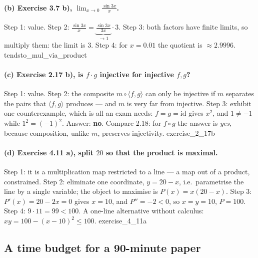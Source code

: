 \documentclass[11pt,a4paper]{article}
\theoremstyle{definition}
\newcommand{\lean}[1]{\textsf{\small #1}}
\begin{document}
\paragraph{(b) Exercise 3.7 b), $\lim_{x\to0}\frac{\sin 3x}{x}$.}
Step 1: value.  Step 2: $\frac{\sin 3x}{x}=\underbrace{\frac{\sin 3x}{3x}}_{\to 1}\cdot 3$.
Step 3: both factors have finite limits, so multiply them: the limit is $3$.
Step 4: for $x=0.01$ the quotient is $\approx 2.9996$. \hfill\lean{tendsto\_mul\_via\_product}

\paragraph{(c) Exercise 2.17 b), is $f\cdot g$ injective for injective $f,g$?}
Step 1: value.  Step 2: the composite $m\circ\langle f,g\rangle$ can only be injective if
$m$ separates the pairs that $\langle f,g\rangle$ produces --- and $m$ is very far from
injective.  Step 3: exhibit one counterexample, which is all an exam needs:
$f=g=\mathrm{id}$ gives $x^2$, and $1\neq-1$ while $1^2=(-1)^2$.  Answer: \textbf{no}.
Compare 2.18: for $f\circ g$ the answer is \emph{yes}, because composition, unlike $m$,
preserves injectivity. \hfill\lean{exercise\_2\_17b}

\paragraph{(d) Exercise 4.11 a), split $20$ so that the product is maximal.}
Step 1: it is a multiplication map restricted to a line --- a map out of a product,
constrained.  Step 2: eliminate one coordinate, $y=20-x$, i.e.\ parametrise the line by a
single variable; the object to maximise is $P(x)=x(20-x)$.  Step 3: $P'(x)=20-2x=0$ gives
$x=10$, and $P''=-2<0$, so $x=y=10$, $P=100$.  Step 4: $9\cdot 11=99<100$.  A one-line
alternative without calculus: $xy=100-(x-10)^2\le100$. \hfill\lean{exercise\_4\_11a}

\subsection{A time budget for a 90-minute paper}
\end{document}
